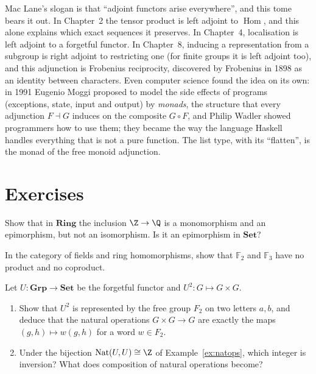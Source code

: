 \begin{beauty}
Mac Lane's slogan is that ``adjoint functors arise everywhere'', and this tome bears it out. In Chapter~2 the tensor product is left adjoint to $\operatorname{Hom}$, and this alone explains which exact sequences it preserves.
In Chapter~4, localisation is left adjoint to a forgetful functor. In Chapter~8, inducing a representation from a subgroup is right adjoint to restricting one (for finite groups it is left adjoint too), and this adjunction is Frobenius reciprocity, discovered by
Frobenius in 1898 as an identity between characters. Even computer science found the idea on its own: in 1991 Eugenio Moggi proposed to model the side effects of programs (exceptions, state, input and output) by
\emph{monads}, the structure that every adjunction $F\dashv G$ induces on the composite $G\circ F$, and Philip Wadler showed programmers how to use them; they became the way the language Haskell handles everything that is not a pure function.
The list type, with its ``flatten'', is the monad of the free monoid adjunction.
\end{beauty}

\section{Exercises}

\begin{exercise}[$\star$]\label{ex:zq}
Show that in $\mathbf{Ring}$ the inclusion $\Z\to\Q$ is a monomorphism and an epimorphism, but not an isomorphism. Is it an epimorphism in $\mathbf{Set}$?
\end{exercise}

\begin{exercise}[$\star$]\label{ex:nofieldproduct}
In the category of fields and ring homomorphisms, show that $\mathbb F_2$ and $\mathbb F_3$ have no product and no coproduct.
\end{exercise}

\begin{exercise}[$\star\star$]\label{ex:words}
Let $U\colon\mathbf{Grp}\to\mathbf{Set}$ be the forgetful functor and $U^2\colon G\mapsto G\times G$.
\begin{enumerate}[label=(\alph*)]
\item Show that $U^2$ is represented by the free group $F_2$ on two letters $a,b$, and deduce that the natural operations $G\times G\to G$ are exactly the maps $(g,h)\mapsto w(g,h)$ for a word $w\in F_2$.
\item Under the bijection $\operatorname{Nat}(U,U)\cong\Z$ of Example~\ref{ex:natops}, which integer is inversion? What does composition of natural operations become?
\end{enumerate}
\end{exercise}

